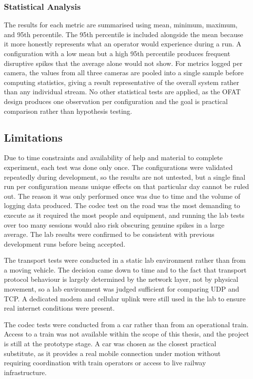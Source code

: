\subsubsection{Statistical Analysis}

The results for each metric are summarised using mean, minimum, maximum, and 95th percentile. The 95th percentile is included alongside the mean because it more honestly represents what an operator would experience during a run. A configuration with a low mean but a high 95th percentile produces frequent disruptive spikes that the average alone would not show. For metrics logged per camera, the values from all three cameras are pooled into a single sample before computing statistics, giving a result representative of the overall system rather than any individual stream. No other statistical tests are applied, as the OFAT design produces one observation per configuration and the goal is practical comparison rather than hypothesis testing.

\vspace{5mm}
\subsection{Limitations}

Due to time constraints and availability of help and material to complete experiment, each test was done only once. The configurations were validated repeatedly during development, so the results are not untested, but a single final run per configuration means unique effects on that particular day cannot be ruled out. The reason it was only performed once was due to time and the volume of logging data produced. The codec test on the road was the most demanding to execute as it required the most people and equipment, and running the lab tests over too many sessions would also risk obscuring genuine spikes in a large average. The lab results were confirmed to be consistent with previous development runs before being accepted.

The transport tests were conducted in a static lab environment rather than from a moving vehicle. The decision came down to time and to the fact that transport protocol behaviour is largely determined by the network layer, not by physical movement, so a lab environment was judged sufficient for comparing UDP and TCP. A dedicated modem and cellular uplink were still used in the lab to ensure real internet conditions were present.

The codec tests were conducted from a car rather than from an operational train. Access to a train was not available within the scope of this thesis, and the project is still at the prototype stage. A car was chosen as the closest practical substitute, as it provides a real mobile connection under motion without requiring coordination with train operators or access to live railway infrastructure.


